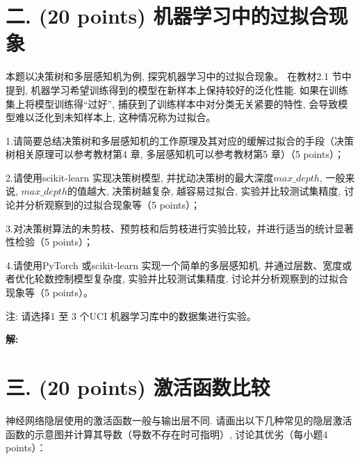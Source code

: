 \documentclass[8pt]{article}
\begin{document}
\vspace{3em}

\section*{二. (20 points) 机器学习中的过拟合现象}

本题以决策树和多层感知机为例, 探究机器学习中的过拟合现象。 在教材2.1 节中提到, 机器学习希望训练得到的模型在新样本上保持较好的泛化性能. 如果在训练集上将模型训练得“过好”, 捕获到了训练样本中对分类无关紧要的特性, 会导致模型难以泛化到未知样本上, 这种情况称为过拟合。

1.请简要总结决策树和多层感知机的工作原理及其对应的缓解过拟合的手段（决策树相关原理可以参考教材第4 章, 多层感知机可以参考教材第5 章）（5 points）；

2.请使用scikit-learn 实现决策树模型, 并扰动决策树的最大深度$max\_ depth$, 一般来说, $max\_ depth$的值越大, 决策树越复杂, 越容易过拟合, 实验并比较测试集精度, 讨论并分析观察到的过拟合现象等（5 points）；

3.对决策树算法的未剪枝、预剪枝和后剪枝进行实验比较，并进行适当的统计显著性检验（5 points）；

4.请使用PyTorch 或scikit-learn 实现一个简单的多层感知机, 并通过层数、宽度或者优化轮数控制模型复杂度, 实验并比较测试集精度, 讨论并分析观察到的过拟合现象等（5 points）。

注: 请选择1 至 3 个UCI 机器学习库中的数据集进行实验。

\textbf{\large 解:}

\vspace{3em}

\section*{三. (20 points) 激活函数比较}
神经网络隐层使用的激活函数一般与输出层不同. 请画出以下几种常见的隐层激活函数的示意图并计算其导数（导数不存在时可指明）, 讨论其优劣（每小题4 points）：
\end{document}
